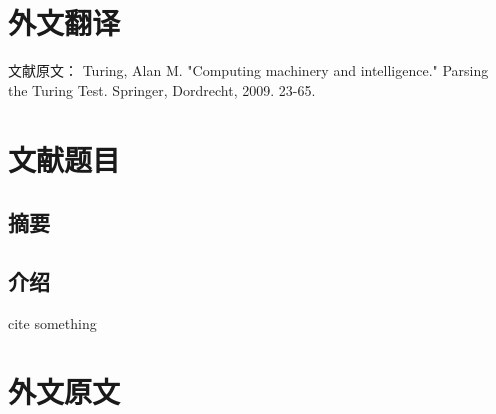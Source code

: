 \chapter{外文翻译}

{
  \setlength{\parindent}{0em}

  文献原文：
  Turing, Alan M. "Computing machinery and intelligence." Parsing the Turing Test. Springer, Dordrecht, 2009. 23-65. \par
}

\vspace{2em}

{
  \renewcommand{\cleardoublepage}{}
  \renewcommand{\clearpage}{}
  \titleformat{\chapter}[block]{\sanhao\songti\bfseries\filcenter}{}{0em}{}{}
  \chapter*{文献题目}
}

\section*{摘要}

\section{介绍}
cite something~\cite{article1}


{
\renewcommand{\bibsection}{\section{\bibname}}

}


\newpage
\chapter{外文原文}

